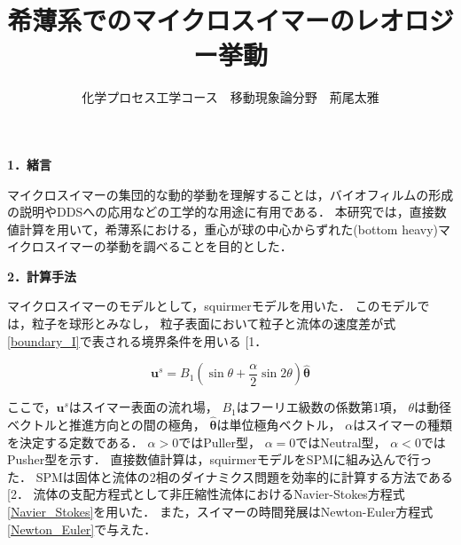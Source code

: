 \documentclass[twocolumns,10pt,a4j]{jarticle}
\title{\Large 希薄系でのマイクロスイマーのレオロジー挙動\vspace{-3truemm}}
\author{\large 化学プロセス工学コース　移動現象論分野　荊尾太雅\vspace{-10zh}}
\date{}
\makeatletter
\DeclareRobustCommand\cite{\unskip
  \@ifnextchar[{\@tempswatrue\@citex}{\@tempswafalse\@citex[]}}
\makeatother
\begin{document}



  \noindent
  \textbf{\large 1．緒言}
  \par
マイクロスイマーの集団的な動的挙動を理解することは，バイオフィルムの形成の説明やDDSへの応用などの工学的な用途に有用である．
本研究では，直接数値計算を用いて，希薄系における，重心が球の中心からずれた(bottom heavy)マイクロスイマーの挙動を調べることを目的とした．


  \noindent
  \textbf{\large 2．計算手法}
  \par
マイクロスイマーのモデルとして，squirmerモデルを用いた．
このモデルでは，粒子を球形とみなし，
粒子表面において粒子と流体の速度差が式\eqref{boundary_I}で表される境界条件を用いる\cite{1}．

  \vspace{-3truemm}
    \begin{equation}
      \boldsymbol{u}^s = B_1 \left( \sin{\theta} + \frac{\alpha}{2} \sin{2\theta} \right) \hat{\boldsymbol{\theta}}
      \label{boundary_I}
    \end{equation}
  \vspace{-4truemm}

  \noindent
ここで，$\boldsymbol{u}^s$はスイマー表面の流れ場，
$B_1$はフーリエ級数の係数第1項，
$\theta$は動径ベクトルと推進方向との間の極角，
$\hat{\boldsymbol{\theta}}$は単位極角ベクトル，
$\alpha$はスイマーの種類を決定する定数である．
$\alpha>0$ではPuller型，
$\alpha=0$ではNeutral型，
$\alpha<0$ではPusher型を示す．
直接数値計算は，squirmerモデルをSPMに組み込んで行った．
SPMは固体と流体の2相のダイナミクス問題を効率的に計算する方法である\cite{2}．
流体の支配方程式として非圧縮性流体におけるNavier-Stokes方程式\eqref{Navier_Stokes}を用いた．
また，スイマーの時間発展はNewton-Euler方程式\eqref{Newton_Euler}で与えた．
\end{document}
